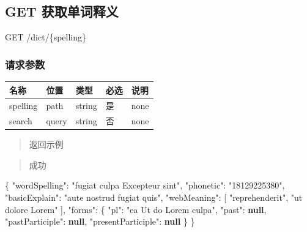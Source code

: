 \documentclass[
]{article}
\newenvironment{Shaded}{}{}
\newcommand{\DataTypeTok}[1]{\textcolor[rgb]{0.56,0.13,0.00}{#1}}
\newcommand{\FunctionTok}[1]{\textcolor[rgb]{0.02,0.16,0.49}{#1}}
\newcommand{\KeywordTok}[1]{\textcolor[rgb]{0.00,0.44,0.13}{\textbf{#1}}}
\newcommand{\OtherTok}[1]{\textcolor[rgb]{0.00,0.44,0.13}{#1}}
\newcommand{\StringTok}[1]{\textcolor[rgb]{0.25,0.44,0.63}{#1}}
\begin{document}
\hypertarget{get-ux83b7ux53d6ux5355ux8bcdux91caux4e49}{%
\subsection{GET
获取单词释义}\label{get-ux83b7ux53d6ux5355ux8bcdux91caux4e49}}

GET /dict/\{spelling\}

\hypertarget{ux8bf7ux6c42ux53c2ux6570-1}{%
\subsubsection{请求参数}\label{ux8bf7ux6c42ux53c2ux6570-1}}

\begin{longtable}[]{@{}lllll@{}}
\toprule
名称 & 位置 & 类型 & 必选 & 说明 \\
\midrule
\endhead
spelling & path & string & 是 & none \\
search & query & string & 否 & none \\
\bottomrule
\end{longtable}

\begin{quote}
返回示例
\end{quote}

\begin{quote}
成功
\end{quote}

\begin{Shaded}
\begin{Highlighting}[]
\FunctionTok{\{}
  \DataTypeTok{"wordSpelling"}\FunctionTok{:} \StringTok{"fugiat culpa Excepteur sint"}\FunctionTok{,}
  \DataTypeTok{"phonetic"}\FunctionTok{:} \StringTok{"18129225380"}\FunctionTok{,}
  \DataTypeTok{"basicExplain"}\FunctionTok{:} \StringTok{"aute nostrud fugiat quis"}\FunctionTok{,}
  \DataTypeTok{"webMeaning"}\FunctionTok{:} \OtherTok{[}
    \StringTok{"reprehenderit"}\OtherTok{,}
    \StringTok{"ut dolore Lorem"}
  \OtherTok{]}\FunctionTok{,}
  \DataTypeTok{"forms"}\FunctionTok{:} \FunctionTok{\{}
    \DataTypeTok{"pl"}\FunctionTok{:} \StringTok{"ea Ut do Lorem culpa"}\FunctionTok{,}
    \DataTypeTok{"past"}\FunctionTok{:} \KeywordTok{null}\FunctionTok{,}
    \DataTypeTok{"pastParticiple"}\FunctionTok{:} \KeywordTok{null}\FunctionTok{,}
    \DataTypeTok{"presentParticiple"}\FunctionTok{:} \KeywordTok{null}
  \FunctionTok{\}}
\FunctionTok{\}}
\end{Highlighting}
\end{Shaded}
\end{document}
